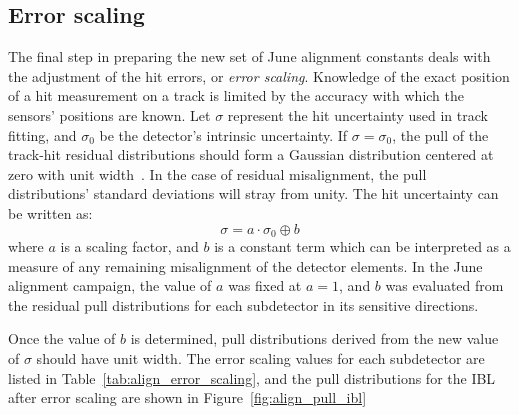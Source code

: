 \subsection{Error scaling}\label{align:2015_results_error_scaling}
The final step in preparing the new set of June alignment constants deals with the adjustment of the hit errors, or \emph{error scaling}.
Knowledge of the exact position of a hit measurement on a track is limited by the accuracy with which the sensors' positions are known.
Let $\sigma$ represent the hit uncertainty used in track fitting, and $\sigma_0$ be the detector's intrinsic uncertainty.
If $\sigma = \sigma_0$, the pull of the track-hit residual distributions should form a Gaussian distribution centered at zero with unit width~\cite{2011.alignment-7tev}.
In the case of residual misalignment, the pull distributions' standard deviations will stray from unity.
The hit uncertainty can be written as:
\begin{equation}
  \sigma = a\cdot\sigma_0\oplus b
  \label{eq:align_error_scaling}
\end{equation}
where $a$ is a scaling factor, and $b$ is a constant term which can be interpreted as a measure of any remaining misalignment of the detector elements.
In the June alignment campaign, the value of $a$ was fixed at $a=1$, and $b$ was evaluated from the residual pull distributions for each subdetector in its sensitive directions.

Once the value of $b$ is determined, pull distributions derived from the new value of $\sigma$ should have unit width.
The error scaling values for each subdetector are listed in Table~\ref{tab:align_error_scaling}, and the pull distributions for the IBL after error scaling are shown in Figure~\ref{fig:align_pull_ibl}

